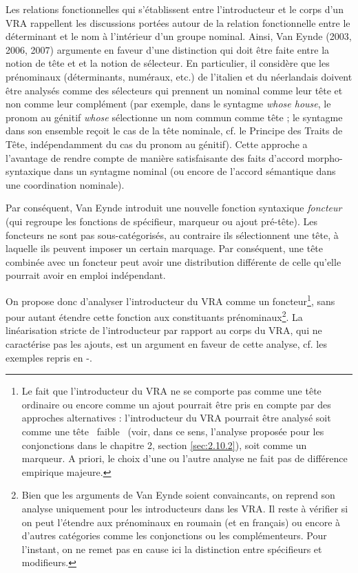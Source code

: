 Les relations fonctionnelles qui s'établissent entre l'introducteur et le corps d'un VRA rappellent les discussions portées autour de la relation fonctionnelle entre le déterminant et le nom à l'intérieur d'un groupe nominal. Ainsi, Van Eynde (2003, 2006, 2007) argumente en faveur d'une distinction qui doit être faite entre la notion de tête  et et la notion de sélecteur. En particulier, il considère que les prénominaux (déterminants, numéraux, etc.) de l'italien et du néerlandais doivent être analysés comme des sélecteurs qui prennent un nominal comme leur tête et non comme leur complément (par exemple, dans le syntagme \textit{whose house}, le pronom au génitif \textit{whose} sélectionne un nom commun comme tête ; le syntagme dans son ensemble reçoit le cas de la tête nominale, cf. le Principe des Traits de Tête, indépendamment du cas du pronom au génitif). Cette approche a l'avantage de rendre compte de manière satisfaisante des faits d'accord morpho-syntaxique dans un syntagme nominal (ou encore de l'accord sémantique dans une coordination nominale).

Par conséquent, Van Eynde introduit une nouvelle fonction syntaxique \textit{foncteur} (qui regroupe les fonctions de spécifieur, marqueur ou ajout pré-tête). Les foncteurs ne sont pas sous-catégorisés, au contraire ils sélectionnent une tête, à laquelle ils peuvent imposer un certain marquage. Par conséquent, une tête combinée avec un foncteur peut avoir une distribution différente de celle qu'elle pourrait avoir en emploi indépendant. 

On propose donc d'analyser l'introducteur du VRA comme un foncteur\footnote{Le fait que l'introducteur du VRA ne se comporte pas comme une tête ordinaire ou encore comme un ajout pourrait être pris en compte par des approches alternatives : l'introducteur du VRA pourrait être analysé soit comme une tête {\guillemotleft}~faible~{\guillemotright} (voir, dans ce sens, l'analyse proposée pour les conjonctions dans le chapitre 2, section \ref{sec:2.10.2}), soit comme un marqueur. A priori, le choix d'une ou l'autre analyse ne fait pas de différence empirique majeure.}, sans pour autant étendre cette fonction aux constituants prénominaux\footnote{Bien que les arguments de Van Eynde soient convaincants, on reprend son analyse uniquement pour les introducteurs dans les VRA. Il reste à vérifier si on peut l'étendre aux prénominaux en roumain (et en français) ou encore à d'autres catégories comme les conjonctions ou les complémenteurs. Pour l'instant, on ne remet pas en cause ici la distinction entre spécifieurs et modifieurs.}. La linéarisation stricte de l'introducteur par rapport au corps du VRA, qui ne caractérise pas les ajouts, est un argument en faveur de cette analyse, cf. les exemples repris en -.


